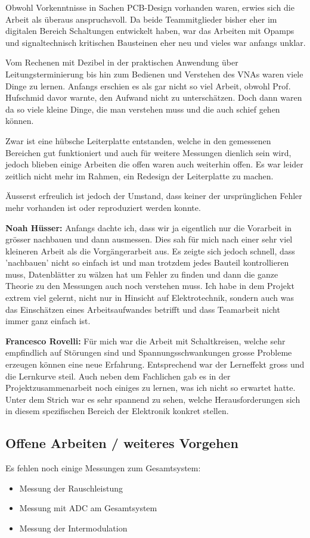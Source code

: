 Obwohl Vorkenntnisse in Sachen PCB-Design vorhanden waren, erwies sich die Arbeit als überaus anspruchsvoll. Da beide Teammitglieder bisher eher im digitalen Bereich Schaltungen entwickelt haben, war das Arbeiten mit Opamps und signaltechnisch kritischen Bausteinen eher neu und vieles war anfangs unklar.

Vom Rechenen mit Dezibel in der praktischen Anwendung über Leitungsterminierung bis hin zum Bedienen und Verstehen des VNAs waren viele Dinge zu lernen. Anfangs erschien es als gar nicht so viel Arbeit, obwohl Prof. Hufschmid davor warnte, den Aufwand nicht zu unterschätzen. Doch dann waren da so viele kleine Dinge, die man verstehen muss und die auch schief gehen können.

Zwar ist eine hübsche Leiterplatte entstanden, welche in den gemessenen Bereichen gut funktioniert und auch für weitere Messungen dienlich sein wird, jedoch blieben einige Arbeiten die offen waren auch weiterhin offen. Es war leider zeitlich nicht mehr im Rahmen, ein Redesign der Leiterplatte zu machen.

Äusserst erfreulich ist jedoch der Umstand, dass keiner der ursprünglichen Fehler mehr vorhanden ist oder reproduziert werden konnte.

\textbf{Noah Hüsser:} Anfangs dachte ich, dass wir ja eigentlich nur die Vorarbeit in grösser nachbauen und dann ausmessen. Dies sah für mich nach einer sehr viel kleineren Arbeit als die Vorgängerarbeit aus. Es zeigte sich jedoch schnell, dass 'nachbauen' nicht so einfach ist und man trotzdem jedes Bauteil kontrollieren muss, Datenblätter zu wälzen hat um Fehler zu finden und dann die ganze Theorie zu den Messungen auch noch verstehen muss. Ich habe in dem Projekt extrem viel gelernt, nicht nur in Hinsicht auf Elektrotechnik, sondern auch was das Einschätzen eines Arbeitsaufwandes betrifft und dass Teamarbeit nicht immer ganz einfach ist.

\textbf{Francesco Rovelli:} Für mich war die Arbeit mit Schaltkreisen, welche sehr empfindlich auf Störungen sind und Spannungsschwankungen grosse Probleme erzeugen können eine neue Erfahrung. Entsprechend war der Lerneffekt gross und die Lernkurve steil. Auch neben dem Fachlichen gab es in der Projektzusammenarbeit noch einiges zu lernen, was ich nicht so erwartet hatte. Unter dem Strich war es sehr spannend zu sehen, welche Herausforderungen sich in diesem spezifischen Bereich der Elektronik konkret stellen.

\subsection*{Offene Arbeiten / weiteres Vorgehen}
Es fehlen noch einige Messungen zum Gesamtsystem:
\begin{itemize}
    \item Messung der Rauschleistung
    \item Messung mit ADC am Gesamtsystem
    \item Messung der Intermodulation
\end{itemize}

